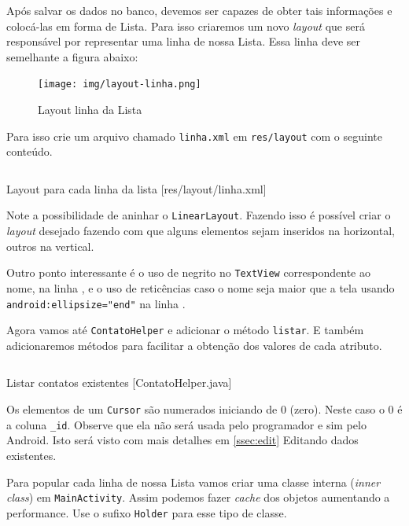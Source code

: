 Após salvar os dados no banco, devemos ser capazes de obter tais
informações e colocá-las em forma de Lista. Para isso criaremos um novo
\emph{layout} que será responsável por representar uma linha de nossa
Lista. Essa linha deve ser semelhante a figura abaixo:

\begin{figure}[h]
    \centering
    \texttt{[image: img/layout-linha.png]}
    \caption{Layout linha da Lista}
\end{figure}

Para isso crie um arquivo chamado \texttt{linha.xml} em
\texttt{res/layout} com o seguinte conteúdo.

\begin{listing}[H]
  \inputminted[linenos=true,frame=bottomline,tabsize=3]{ xml }{ source/linha-1.xml }
  \caption{Layout para cada linha da lista [res/layout/linha.xml]}
\end{listing}

Note a possibilidade de aninhar o \texttt{LinearLayout}. Fazendo isso é
possível criar o \emph{layout} desejado fazendo com que alguns elementos
sejam inseridos na horizontal, outros na vertical.

Outro ponto interessante é o uso de negrito no \texttt{TextView}
correspondente ao nome, na linha , e o uso de reticências
caso o nome seja maior que a tela usando
\texttt{android:ellipsize="end"} na linha .

Agora vamos até \texttt{ContatoHelper} e adicionar o método
\texttt{listar}. E também adicionaremos métodos para facilitar a
obtenção dos valores de cada atributo.

\begin{listing}[H]
  \inputminted[linenos=true,frame=bottomline,tabsize=3]{ java }{ source/ContatoHelper-3.java }
  \caption{Listar contatos existentes [ContatoHelper.java]}
\end{listing}

Os elementos de um \texttt{Cursor} são numerados iniciando de 0 (zero).
Neste caso o 0 é a coluna \texttt{\_id}. Observe que ela não será usada
pelo programador e sim pelo Android. Isto será visto com mais detalhes
em \ref{ssec:edit} Editando dados existentes.

Para popular cada linha de nossa Lista vamos criar uma classe interna
(\emph{inner class}) em \texttt{MainActivity}. Assim podemos fazer
\emph{cache} dos objetos aumentando a performance. Use o sufixo
\texttt{Holder} para esse tipo de classe.

